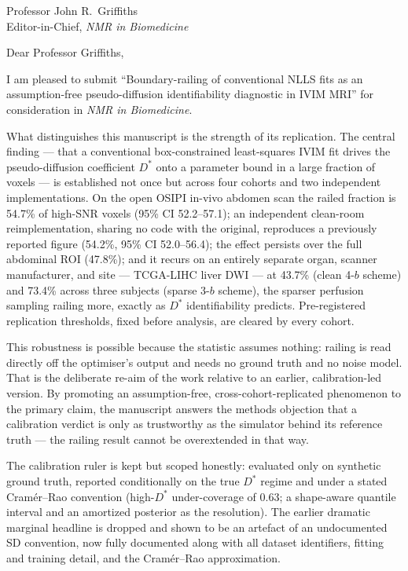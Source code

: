 \documentclass[11pt]{letter}
\begin{document}
\begin{letter}{Professor John R.\ Griffiths \\ Editor-in-Chief, \textit{NMR in Biomedicine}}
\opening{Dear Professor Griffiths,}

I am pleased to submit ``Boundary-railing of conventional NLLS fits as an
assumption-free pseudo-diffusion identifiability diagnostic in IVIM MRI'' for
consideration in \textit{NMR in Biomedicine}.

What distinguishes this manuscript is the strength of its replication. The central
finding --- that a conventional box-constrained least-squares IVIM fit drives the
pseudo-diffusion coefficient $D^{*}$ onto a parameter bound in a large fraction of
voxels --- is established not once but across four cohorts and two independent
implementations. On the open OSIPI in-vivo abdomen scan the railed fraction is
54.7\% of high-SNR voxels (95\% CI 52.2--57.1); an independent clean-room
reimplementation, sharing no code with the original, reproduces a previously
reported figure (54.2\%, 95\% CI 52.0--56.4); the effect persists over the full
abdominal ROI (47.8\%); and it recurs on an entirely separate organ, scanner
manufacturer, and site --- TCGA-LIHC liver DWI --- at 43.7\% (clean 4-$b$ scheme)
and 73.4\% across three subjects (sparse 3-$b$ scheme), the sparser perfusion
sampling railing more, exactly as $D^{*}$ identifiability predicts. Pre-registered
replication thresholds, fixed before analysis, are cleared by every cohort.

This robustness is possible because the statistic assumes nothing: railing is read
directly off the optimiser's output and needs no ground truth and no noise model.
That is the deliberate re-aim of the work relative to an earlier, calibration-led
version. By promoting an assumption-free, cross-cohort-replicated phenomenon to the
primary claim, the manuscript answers the methods objection that a calibration
verdict is only as trustworthy as the simulator behind its reference truth --- the
railing result cannot be overextended in that way.

The calibration ruler is kept but scoped honestly: evaluated only on synthetic
ground truth, reported conditionally on the true $D^{*}$ regime and under a stated
Cram\'er--Rao convention (high-$D^{*}$ under-coverage of 0.63; a shape-aware
quantile interval and an amortized posterior as the resolution). The earlier
dramatic marginal headline is dropped and shown to be an artefact of an
undocumented SD convention, now fully documented along with all dataset
identifiers, fitting and training detail, and the Cram\'er--Rao approximation.


\end{letter}
\end{document}
